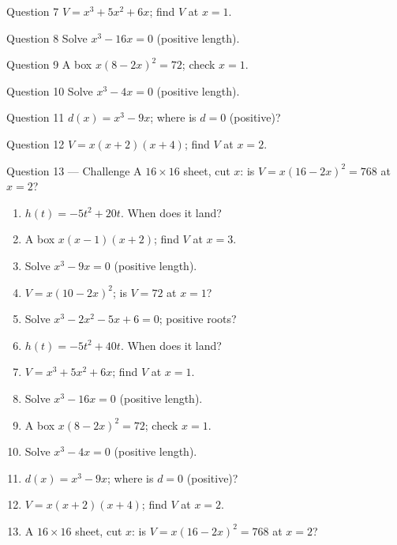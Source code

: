 \documentclass[11pt]{article}
\begin{document}
\begin{qbox}{Question 7}
$V=x^3+5x^2+6x$; find $V$ at $x=1$.\workspace{2.4cm}
\end{qbox}

\begin{qbox}{Question 8}
Solve $x^3-16x=0$ (positive length).\workspace{2.4cm}
\end{qbox}

\begin{qbox}{Question 9}
A box $x(8-2x)^2=72$; check $x=1$.\workspace{2.4cm}
\end{qbox}

\begin{qbox}{Question 10}
Solve $x^3-4x=0$ (positive length).\workspace{2.4cm}
\end{qbox}

\begin{qbox}{Question 11}
$d(x)=x^3-9x$; where is $d=0$ (positive)?\workspace{2.4cm}
\end{qbox}

\begin{qbox}{Question 12}
$V=x(x+2)(x+4)$; find $V$ at $x=2$.\workspace{2.4cm}
\end{qbox}

\begin{qbox}{Question 13 --- Challenge}
A $16\times16$ sheet, cut $x$: is $V=x(16-2x)^2=768$ at $x=2$?\workspace{3.2cm}
\end{qbox}

\clearpage
{}

\begin{recapbox}
\begin{multicols}{2}
\small
\begin{enumerate}[leftmargin=*,itemsep=3pt]
  \item $h(t)=-5t^2+20t$. When does it land?
  \item A box $x(x-1)(x+2)$; find $V$ at $x=3$.
  \item Solve $x^3-9x=0$ (positive length).
  \item $V=x(10-2x)^2$; is $V=72$ at $x=1$?
  \item Solve $x^3-2x^2-5x+6=0$; positive roots?
  \item $h(t)=-5t^2+40t$. When does it land?
  \item $V=x^3+5x^2+6x$; find $V$ at $x=1$.
  \item Solve $x^3-16x=0$ (positive length).
  \item A box $x(8-2x)^2=72$; check $x=1$.
  \item Solve $x^3-4x=0$ (positive length).
  \item $d(x)=x^3-9x$; where is $d=0$ (positive)?
  \item $V=x(x+2)(x+4)$; find $V$ at $x=2$.
  \item A $16\times16$ sheet, cut $x$: is $V=x(16-2x)^2=768$ at $x=2$?
\end{enumerate}
\end{multicols}
\end{recapbox}
\end{document}
